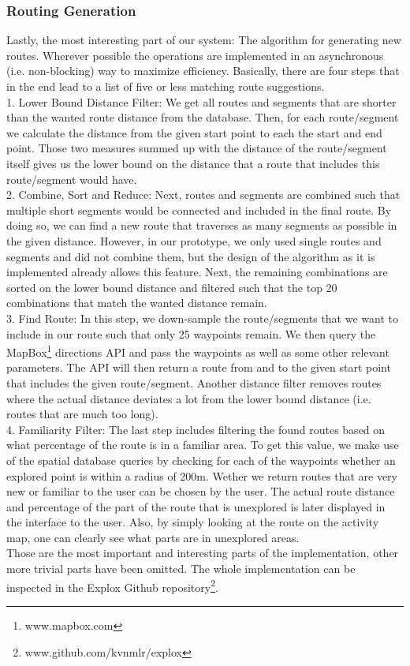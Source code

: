 \documentclass{sigchi}
\begin{document}
\subsubsection{Routing Generation}
Lastly, the most interesting part of our system: The algorithm for generating new routes. Wherever possible the operations are implemented in an asynchronous (i.e. non-blocking) way to maximize efficiency. Basically, there are four steps that in the end lead to a list of five or less matching route suggestions.\\
1. Lower Bound Distance Filter: We get all routes and segments that are shorter than the wanted route distance from the database. Then, for each route/segment we calculate the distance from the given start point to each the start and end point. Those two measures summed up with the distance of the route/segment itself gives us the lower bound on the distance that a route that includes this route/segment would have.\\
2. Combine, Sort and Reduce: Next, routes and segments are combined such that multiple short segments would be connected and included in the final route. By doing so, we can find a new route that traverses as many segments as possible in the given distance. However, in our prototype, we only used single routes and segments and did not combine them, but the design of the algorithm as it is implemented already allows this feature. Next, the remaining combinations are sorted on the lower bound distance and filtered such that the top 20 combinations that match the wanted distance remain.\\
3. Find Route: In this step, we down-sample the route/segments that we want to include in our route such that only 25 waypoints remain. We then query the MapBox\footnote{www.mapbox.com} directions API and pass the waypoints as well as some other relevant parameters. The API will then return a route from and to the given start point that includes the given route/segment. Another distance filter removes routes where the actual distance deviates a lot from the lower bound distance (i.e. routes that are much too long).\\
4. Familiarity Filter: The last step includes filtering the found routes based on what percentage of the route is in a familiar area. To get this value, we make use of the spatial database queries by checking for each of the waypoints whether an explored point is within a radius of 200m. Wether we return routes that are very new or familiar to the user can be chosen by the user. The actual route distance and percentage of the part of the route that is unexplored is later displayed in the interface to the user. Also, by simply looking at the route on the activity map, one can clearly see what parts are in unexplored areas.\\
Those are the most important and interesting parts of the implementation, other more trivial parts have been omitted. The whole implementation can be inspected in the Explox Github repository\footnote{www.github.com/kvnmlr/explox}.
\end{document}
